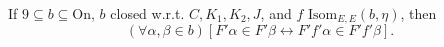 If $9 \subseteq b \subseteq \mathrm{On}$, $b$ closed w.r.t. $C, K_1, K_2, J$, and $f \text{ Isom}_{E,E}(b, \eta)$, then
$$(\forall \alpha, \beta \in b) [F' \alpha \in F' \beta \leftrightarrow F' f' \alpha \in F' f' \beta].$$

